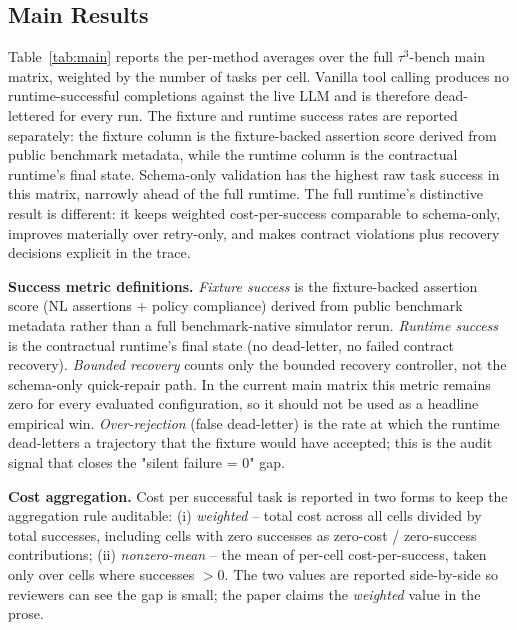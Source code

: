 \subsection{Main Results}

Table~\ref{tab:main} reports the per-method averages over the full \mbox{$\tau^3$}-bench main matrix, weighted by the number of tasks per cell. Vanilla tool calling produces no runtime-successful completions against the live LLM and is therefore dead-lettered for every run. The fixture and runtime success rates are reported separately: the fixture column is the fixture-backed assertion score derived from public benchmark metadata, while the runtime column is the contractual runtime's final state. Schema-only validation has the highest raw task success in this matrix, narrowly ahead of the full runtime. The full runtime's distinctive result is different: it keeps weighted cost-per-success comparable to schema-only, improves materially over retry-only, and makes contract violations plus recovery decisions explicit in the trace.

\textbf{Success metric definitions.} \emph{Fixture success} is the fixture-backed assertion score (NL assertions + policy compliance) derived from public benchmark metadata rather than a full benchmark-native simulator rerun. \emph{Runtime success} is the contractual runtime's final state (no dead-letter, no failed contract recovery). \emph{Bounded recovery} counts only the bounded recovery controller, not the schema-only quick-repair path. In the current main matrix this metric remains zero for every evaluated configuration, so it should not be used as a headline empirical win. \emph{Over-rejection} (false dead-letter) is the rate at which the runtime dead-letters a trajectory that the fixture would have accepted; this is the audit signal that closes the "silent failure = 0" gap.

\textbf{Cost aggregation.} Cost per successful task is reported in two forms to keep the aggregation rule auditable: (i) \emph{weighted} -- total cost across all cells divided by total successes, including cells with zero successes as zero-cost / zero-success contributions; (ii) \emph{nonzero-mean} -- the mean of per-cell cost-per-success, taken only over cells where successes $> 0$.  The two values are reported side-by-side so reviewers can see the gap is small; the paper claims the \emph{weighted} value in the prose.

